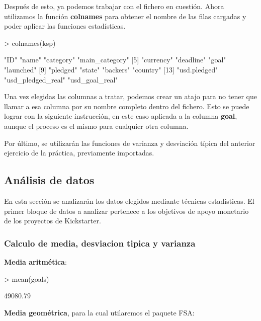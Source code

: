\documentclass [a4paper] {article}
\begin{document}
Después de esto, ya podemos trabajar con el fichero en cuestión. Ahora utilizamos la función \textbf{colnames}
para obtener el nombre de las filas cargadas y poder aplicar las funciones estadísticas. 
\begin{Schunk}
\begin{Sinput}
> colnames(ksp)
\end{Sinput}
\begin{Soutput}
 [1] "ID"               "name"             "category"         "main_category"   
 [5] "currency"         "deadline"         "goal"             "launched"        
 [9] "pledged"          "state"            "backers"          "country"         
[13] "usd.pledged"      "usd_pledged_real" "usd_goal_real"   
\end{Soutput}
\end{Schunk}
Una vez elegidas las columnas a tratar, podemos crear un atajo para no tener que llamar a esa columna por su nombre completo
dentro del fichero. Esto se puede lograr con la siguiente instrucción, en este caso aplicada a la columna \textbf{goal}, 
aunque el proceso es el mismo para cualquier otra columna.
\begin{Schunk}
\end{Schunk}
Por último, se utilizarán las funciones de varianza y desviación típica del anterior ejercicio de la práctica, previamente importadas.\\

\subsection{Análisis de datos}
En esta sección se analizarán los datos elegidos mediante técnicas estadísticas. El primer bloque de datos 
a analizar pertenece a los objetivos de apoyo monetario de los proyectos de Kickstarter. \\
\subsubsection{Calculo de media, desviacion tipica y varianza}
\textbf{Media aritmética}:

\begin{Schunk}
\begin{Sinput}
> mean(goals)
\end{Sinput}
\begin{Soutput}
[1] 49080.79
\end{Soutput}
\end{Schunk}
\textbf{Media geométrica}, para la cual utilaremos el paquete FSA:
\end{document}
